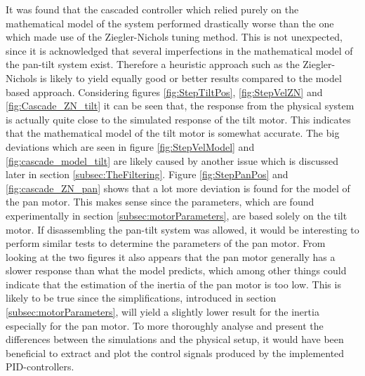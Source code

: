 \documentclass[../../main.tex]{subfiles}
\begin{document}
It was found that the cascaded controller which relied purely on the mathematical model of the system performed drastically worse than the one which made use of the Ziegler-Nichols tuning method. This is not unexpected, since it is acknowledged that several imperfections in the mathematical model of the pan-tilt system exist. Therefore a heuristic approach such as the Ziegler-Nichols is likely to yield equally good or better results compared to the model based approach. Considering figures \ref{fig:StepTiltPos}, \ref{fig:StepVelZN} and \ref{fig:Cascade_ZN_tilt} it can be seen that, the response from the physical system is actually quite close to the simulated response of the tilt motor. This indicates that the mathematical model of the tilt motor is somewhat accurate. The big deviations which are seen in figure \ref{fig:StepVelModel} and \ref{fig:cascade_model_tilt} are likely caused by another issue which is discussed later in section \ref{subsec:TheFiltering}. Figure \ref{fig:StepPanPos} and \ref{fig:cascade_ZN_pan} shows that a lot more deviation is found for the model of the pan motor. This makes sense since the parameters, which are found experimentally in section \ref{subsec:motorParameters}, are based solely on the tilt motor. If disassembling the pan-tilt system was allowed, it would be interesting to perform similar tests to determine the parameters of the pan motor. From looking at the two figures it also appears that the pan motor generally has a slower response than what the model predicts, which among other things could indicate that the estimation of the inertia of the pan motor is too low. This is likely to be true since the simplifications, introduced in section \ref{subsec:motorParameters}, will yield a slightly lower result for the inertia especially for the pan motor. To more thoroughly analyse and present the differences between the simulations and the physical setup, it would have been beneficial to extract and plot the control signals produced by the implemented PID-controllers.



\end{document}
